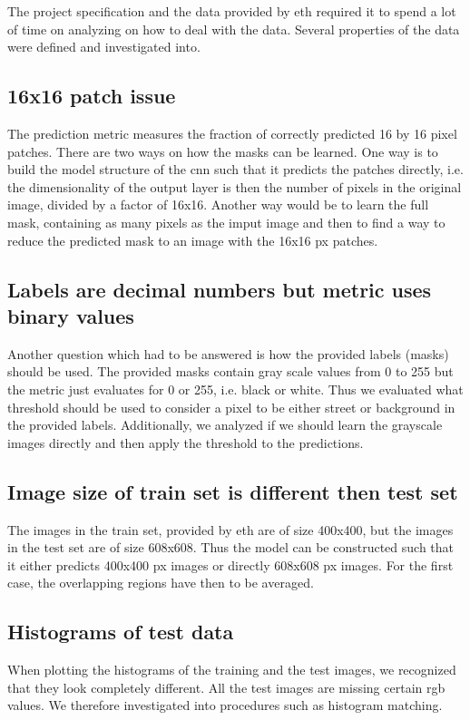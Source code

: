 





The project specification and the data provided by \acrshort{eth} required it to spend a lot of time on analyzing on how to deal with the data. Several properties of the data were defined and investigated into.

\subsection{16x16 patch issue} 
The prediction metric measures the fraction of correctly predicted 16 by 16 pixel patches. There are two ways on how the masks can be learned. One way is to build the model structure of the \acrshort{cnn} such that it predicts the patches directly, i.e. the dimensionality of the output layer is then the number of pixels in the original image, divided by a factor of 16x16. Another way would be to learn the full mask, containing as many pixels as the imput image and then to find a way to reduce the predicted mask to an image with the 16x16 px patches.
\subsection{Labels are decimal numbers but metric uses binary values}
Another question which had to be answered is how the provided labels (masks) should be used. The provided masks contain gray scale values from 0 to 255 but the metric just evaluates for 0 or 255, i.e. black or white. Thus we evaluated what threshold should be used to consider a pixel to be either street or background in the provided labels. Additionally, we analyzed if we should learn the grayscale images directly and then apply the threshold to the predictions.
\subsection{Image size of train set is different then test set}
The images in the train set, provided by \acrshort{eth} are of size 400x400, but the images in the test set are of size 608x608. Thus the model can be constructed such that it either predicts 400x400 px images or directly 608x608 px images. For the first case, the overlapping regions have then to be averaged.

\subsection{Histograms of test data}  \label{sec:histogram}
When plotting the histograms of the training and the test images, we recognized that they look completely different. All the test images are missing certain \acrshort{rgb} values. We therefore investigated into procedures such as histogram matching. 

